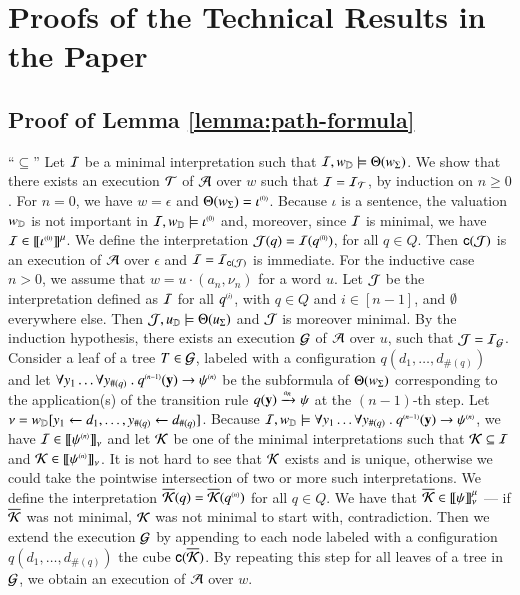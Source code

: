\section{Proofs of the Technical Results in the Paper}
\label{app:proofs}

\subsection{Proof of Lemma \ref{lemma:path-formula}}

``$\subseteq$'' Let $\mathcal{I}$ be a minimal interpretation such that
$\mathcal{I},{w}_{\mathbb{D}} \models \Theta({{w}_\Sigma})$. We show that there exists
an execution $\mathcal{T}$ of $\mathcal{A}$ over $w$ such that $\mathcal{I} = \mathcal{I}_{\mathcal{T}}$, by
induction on $n\geq 0$. For $n=0$, we have $w=\epsilon$ and
$\Theta({{w}_\Sigma}) = {\iota}^{\scriptscriptstyle{({0})}}$. Because $\iota$ is a
sentence, the valuation ${w}_{\mathbb{D}}$ is not important in $\mathcal{I},{w}_{\mathbb{D}}
\models {\iota}^{\scriptscriptstyle{({0})}}$ and, moreover, since $\mathcal{I}$ is minimal, we
have $\mathcal{I} \in {\bf [\![} {\iota}^{\scriptscriptstyle{({0})}} {\bf ]\!]}^\mu$. We define the interpretation
$\mathcal{J}(q)=\mathcal{I}({q}^{\scriptscriptstyle{({0})}})$, for all $q \in Q$. Then $\mathsf{c}({\mathcal{J}})$ is an
execution of $\mathcal{A}$ over $\epsilon$ and $\mathcal{I} = \mathcal{I}_{\mathsf{c}({\mathcal{J}})}$ is
immediate. For the inductive case $n>0$, we assume that
$w=u\cdot(a_n,\nu_n)$ for a word $u$. Let $\mathcal{J}$ be the interpretation
defined as $\mathcal{I}$ for all ${q}^{\scriptscriptstyle{({i})}}$, with $q \in Q$ and $i \in
[n-1]$, and $\emptyset$ everywhere else. Then $\mathcal{J},u_{\mathbb{D}} \models
\Theta({u_\Sigma})$ and $\mathcal{J}$ is moreover minimal. By the induction
hypothesis, there exists an execution $\mathcal{G}$ of $\mathcal{A}$ over $u$, such that
$\mathcal{J} = \mathcal{I}_{\mathcal{G}}$. Consider a leaf of a tree $T \in \mathcal{G}$, labeled with a
configuration $q(d_1,\ldots,d_{\#(q)})$ and let $\forall y_1 \ldots
\forall y_{\#(q)} ~.~ {q}^{\scriptscriptstyle{({n-1})}}(\mathbf y) \rightarrow
{\psi}^{\scriptscriptstyle{({n})}}$ be the subformula of $\Theta({{w}_\Sigma})$
corresponding to the application(s) of the transition rule $q(\mathbf y)
\xrightarrow{{\scriptscriptstyle a_n}}_{{\scriptstyle }} \psi$ at the $(n-1)$-th step. Let $\nu = {w}_{\mathbb{D}}[y_1
  \leftarrow d_1,\ldots,y_{\#(q)} \leftarrow d_{\#(q)}]$. Because $\mathcal{I},
{w}_{\mathbb{D}} \models \forall y_1 \ldots \forall y_{\#(q)} ~.~
{q}^{\scriptscriptstyle{({n-1})}}(\mathbf y) \rightarrow {\psi}^{\scriptscriptstyle{({n})}}$, we have $\mathcal{I} \in
{\bf [\![} {\psi}^{\scriptscriptstyle{({n})}} {\bf ]\!]}_{\nu}$ and let $\mathcal{K}$ be one of the minimal
interpretations such that $\mathcal{K} \subseteq \mathcal{I}$ and $\mathcal{K} \in
{\bf [\![} {\psi}^{\scriptscriptstyle{({n})}} {\bf ]\!]}_{\nu}$. It is not hard to see that $\mathcal{K}$ exists
and is unique, otherwise we could take the pointwise intersection of
two or more such interpretations. We define the interpretation
$\overline{\mathcal{K}}(q) = \overline{\mathcal{K}}({q}^{\scriptscriptstyle{({n})}})$ for all $q \in Q$. We
have that $\overline{\mathcal{K}} \in {\bf [\![} \psi {\bf ]\!]}^\mu_{\nu}$ --- if
$\overline{\mathcal{K}}$ was not minimal, $\mathcal{K}$ was not minimal to start with,
contradiction. Then we extend the execution $\mathcal{G}$ by appending to each
node labeled with a configuration $q(d_1, \ldots, d_{\#(q)})$ the cube
$\mathsf{c}({\overline{\mathcal{K}}})$. By repeating this step for all leaves of a
tree in $\mathcal{G}$, we obtain an execution of $\mathcal{A}$ over $w$.

